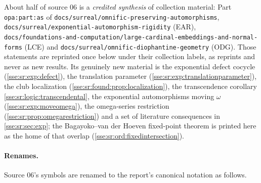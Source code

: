 \documentclass[11pt,a4paper]{article}
\numberwithin{equation}{section}
\theoremstyle{plain}
\theoremstyle{definition}
\theoremstyle{remark}
\newcommand{\lbl}[1]{\nolinkurl{#1}}%
\newcommand{\fn}[1]{\nolinkurl{#1}}%
\begin{document}
About half of source 06 is a \emph{credited synthesis} of collection
material: Part \lbl{opa:part:as} of \fn{docs/surreal/omnific-preserving-automorphisms},
\fn{docs/surreal/exponential-automorphism-rigidity} (EAR),
\fn{docs/foundations-and-computation/large-cardinal-embeddings-and-normal-forms}
(LCE) and \fn{docs/surreal/omnific-diophantine-geometry} (ODG). Those statements
are reprinted once below under their collection labels, as reprints and never
as new results. Its genuinely new material is the exponential defect cocycle
(\cref{sse:sr:exp:defect}), the translation parameter
(\cref{sse:sr:exp:translationparameter}), the club localization
(\cref{sse:sr:found:prop:localization}), the transcendence corollary
\cref{sse:sr:logic:transcendental}, the exponential automorphisms moving
$\omega$ (\cref{sse:sr:exp:moveomega}), the omega-series restriction
(\cref{sse:sr:prop:omegarestriction}) and a set of literature consequences
in \cref{sse:sr:sec:exp}; the Bagayoko--van der Hoeven fixed-point theorem is
printed here as the home of that overlap (\cref{sse:sr:ord:fixedintersection}).

\paragraph{Renames.} Source 06's symbols are renamed to the report's
canonical notation as follows.
\end{document}
